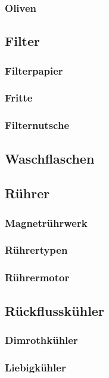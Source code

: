 \subsubsection{Oliven}

\subsection{Filter}
\subsubsection{Filterpapier}
\subsubsection{Fritte}
\subsubsection{Filternutsche}

\subsection{Waschflaschen}

\subsection{Rührer}
\subsubsection{Magnetrührwerk}
\subsubsection{Rührertypen}
\subsubsection{Rührermotor}

\subsection{Rückflusskühler}
\subsubsection{Dimrothkühler}
\subsubsection{Liebigkühler}

